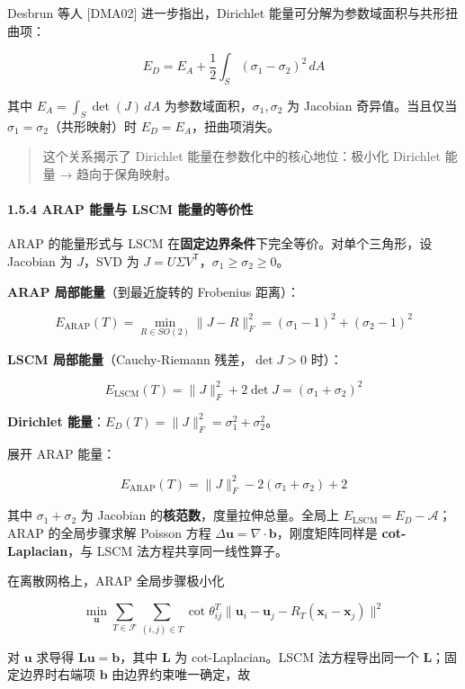 \documentclass[
]{article}
\begin{document}
Desbrun 等人 {[}DMA02{]} 进一步指出，Dirichlet
能量可分解为参数域面积与共形扭曲项：

\[
E_D = E_A + \frac{1}{2}\int_S (\sigma_1 - \sigma_2)^2 \,dA
\]

其中 \(E_A = \int_S \det(J)\,dA\) 为参数域面积，\(\sigma_1, \sigma_2\)
为 Jacobian 奇异值。当且仅当 \(\sigma_1 = \sigma_2\)（共形映射）时
\(E_D = E_A\)，扭曲项消失。

\begin{quote}
这个关系揭示了 Dirichlet 能量在参数化中的核心地位：极小化 Dirichlet 能量
→ 趋向于保角映射。
\end{quote}

\paragraph{1.5.4 ARAP 能量与 LSCM
能量的等价性}\label{arap-ux80fdux91cfux4e0e-lscm-ux80fdux91cfux7684ux7b49ux4ef7ux6027}

ARAP 的能量形式与 LSCM
在\textbf{固定边界条件}下完全等价。对单个三角形，设 Jacobian 为
\(J\)，SVD 为
\(J = U\Sigma V^{\mathsf T}\)，\(\sigma_1 \geq \sigma_2 \geq 0\)。

\textbf{ARAP 局部能量}（到最近旋转的 Frobenius 距离）：

\[
E_{\text{ARAP}}(T) = \min_{R \in SO(2)} \|J - R\|_F^2 = (\sigma_1 - 1)^2 + (\sigma_2 - 1)^2
\]

\textbf{LSCM 局部能量}（Cauchy-Riemann 残差，\(\det J > 0\) 时）：

\[
E_{\text{LSCM}}(T) = \|J\|_F^2 + 2\det J = (\sigma_1 + \sigma_2)^2
\]

\textbf{Dirichlet
能量}：\(E_D(T) = \|J\|_F^2 = \sigma_1^2 + \sigma_2^2\)。

展开 ARAP 能量：

\[
E_{\text{ARAP}}(T) = \|J\|_F^2 - 2(\sigma_1 + \sigma_2) + 2
\]

其中 \(\sigma_1 + \sigma_2\) 为 Jacobian
的\textbf{核范数}，度量拉伸总量。全局上
\(E_{\text{LSCM}} = E_D - \mathcal{A}\)；ARAP 的全局步骤求解 Poisson
方程 \(\Delta \mathbf{u} = \nabla \cdot \mathbf{b}\)，刚度矩阵同样是
\textbf{cot-Laplacian}，与 LSCM 法方程共享同一线性算子。

在离散网格上，ARAP 全局步骤极小化

\[
\min_{\mathbf{u}} \sum_{T \in \mathcal{F}} \sum_{(i,j) \in T} \cot\theta_{ij}^T \|\mathbf{u}_i - \mathbf{u}_j - R_T(\mathbf{x}_i - \mathbf{x}_j)\|^2
\]

对 \(\mathbf{u}\) 求导得 \(\mathbf{L}\mathbf{u} = \mathbf{b}\)，其中
\(\mathbf{L}\) 为 cot-Laplacian。LSCM 法方程导出同一个
\(\mathbf{L}\)；固定边界时右端项 \(\mathbf{b}\) 由边界约束唯一确定，故
\end{document}
